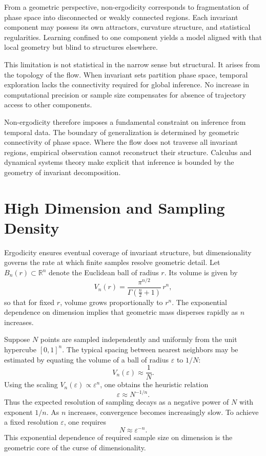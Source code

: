 \documentclass[12pt]{book}
\begin{document}
From a geometric perspective, non-ergodicity corresponds to fragmentation of phase space into disconnected or weakly connected regions. Each invariant component may possess its own attractors, curvature structure, and statistical regularities. Learning confined to one component yields a model aligned with that local geometry but blind to structures elsewhere.

This limitation is not statistical in the narrow sense but structural. It arises from the topology of the flow. When invariant sets partition phase space, temporal exploration lacks the connectivity required for global inference. No increase in computational precision or sample size compensates for absence of trajectory access to other components.

Non-ergodicity therefore imposes a fundamental constraint on inference from temporal data. The boundary of generalization is determined by geometric connectivity of phase space. Where the flow does not traverse all invariant regions, empirical observation cannot reconstruct their structure. Calculus and dynamical systems theory make explicit that inference is bounded by the geometry of invariant decomposition.

\section{High Dimension and Sampling Density}

Ergodicity ensures eventual coverage of invariant structure, but dimensionality governs the rate at which finite samples resolve geometric detail. Let $B_n(r) \subset \mathbb{R}^n$ denote the Euclidean ball of radius $r$. Its volume is given by
\[
V_n(r)
=
\frac{\pi^{n/2}}{\Gamma\!\left(\frac{n}{2}+1\right)}
\, r^n,
\]
so that for fixed $r$, volume grows proportionally to $r^n$. The exponential dependence on dimension implies that geometric mass disperses rapidly as $n$ increases.

Suppose $N$ points are sampled independently and uniformly from the unit hypercube $[0,1]^n$. The typical spacing between nearest neighbors may be estimated by equating the volume of a ball of radius $\varepsilon$ to $1/N$:
\[
V_n(\varepsilon) \approx \frac{1}{N}.
\]
Using the scaling $V_n(\varepsilon) \propto \varepsilon^n$, one obtains the heuristic relation
\[
\varepsilon \approx N^{-1/n}.
\]
Thus the expected resolution of sampling decays as a negative power of $N$ with exponent $1/n$. As $n$ increases, convergence becomes increasingly slow. To achieve a fixed resolution $\varepsilon$, one requires
\[
N \approx \varepsilon^{-n}.
\]
This exponential dependence of required sample size on dimension is the geometric core of the curse of dimensionality.
\end{document}
